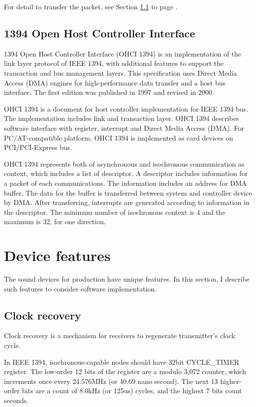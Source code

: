 \documentclass[onecolumn]{article}
\begin{document}
For detail to transfer the packet, see Section \ref{sec:clock-recovery} to page \pageref{sec:clock-recovery}.

\subsection{1394 Open Host Controller Interface}
\label{ohci-1394}

1394 Open Host Controller Interface (OHCI 1394) is an implementation of the link layer protocol of IEEE 1394, with additional features to support the transaction and bus management layers. This specification uses Direct Media Access (DMA) engines for high-performance data transfer and a host bus interface. The first edition was published in 1997\cite{ohci1394-1} and revised in 2000\cite{ohci1394-1-1}.

OHCI 1394 is a document for host controller implementation for IEEE 1394 bus. The implementation includes link and transaction layer. OHCI 1394 describes software interface with register, interrupt and Direct Media Access (DMA). For PC/AT-compatible platform, OHCI 1394 is implemented as card devices on PCI/PCI-Express bus.

OHCI 1394 represents both of asynchronous and isochronous communication as context, which includes a list of descriptor. A descriptor includes information for a packet of each communications. The information includes an address for DMA buffer. The data for the buffer is transferred between system and controller device by DMA. After transferring, interrupts are generated according to information in the descriptor. The minimum number of isochronous context is 4 and the maximum is 32, for one direction.

\section{Device features}

The sound devices for production have unique features. In this section, I describe such features to consider software implementation.

\subsection{Clock recovery}
\label{sec:clock-recovery}

Clock recovery is a mechanism for receivers to regenerate transmitter's clock cycle.

In IEEE 1394\cite{ieee1394-2}, isochronous-capable nodes should have 32bit CYCLE\_TIMER register. The low-order 12 bits of the register are a modulo 3,072 counter, which increments once every 24.576MHz (or 40.69 nano second). The next 13 higher-order bits are a count of 8.0kHz (or 125us) cycles, and the highest 7 bits count seconds.
\end{document}

